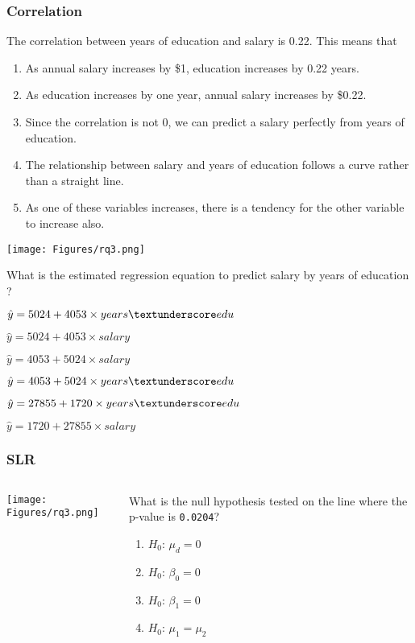 \begin{frame}
\frametitle{Correlation}
\begin{clicker}{The correlation between years of education and salary is 0.22.  This means that}
\begin{enumerate}
    \item
    As annual salary increases by \$1, education increases by 0.22 years.
    \item
    As education increases by one year, annual salary increases by \$0.22.
    \item
    Since the correlation is not 0, we can predict a salary perfectly from years of education.
    \item
    The relationship between salary and years of education follows a curve rather than a straight line.
    \item
    As one of these variables increases, there is a tendency for the other variable to increase also.
\end{enumerate}
\end{clicker}
\end{frame}

\begin{frame}
\texttt{[image: Figures/rq3.png]}\\
\begin{clicker}{\small{What is the estimated regression equation to predict salary  by years of education ?}}
\begin{enumerate}\small{
    \item
    $\hat{y}= 5024 + 4053 \times years\textunderscore edu$
    \item
    $\hat{y}= 5024 + 4053 \times salary$
    \item
    $\hat{y}= 4053 + 5024 \times salary$
    \item
    $\hat{y}= 4053 + 5024 \times years\textunderscore edu$
    \item
    $\hat{y}= 27855 + 1720 \times years\textunderscore edu$
    \item
    $\hat{y}= 1720 + 27855 \times salary$}
\end{enumerate}
\end{clicker}
\end{frame}


\begin{frame}
\frametitle{SLR}
\begin{columns}
\texttt{[image: Figures/rq3.png]}
\begin{clicker}{What is the null hypothesis tested on the line where the p-value is \texttt{0.0204}?}
\begin{enumerate}
    \item
    $H_0$: $\mu_d=0$
    \item
    $H_0$: $\beta_0=0$
    \item
    $H_0$: $\beta_1=0$
    \item
    $H_0$: $\mu_1=\mu_2$
\end{enumerate}
\end{clicker}
\end{columns}
\end{frame}

